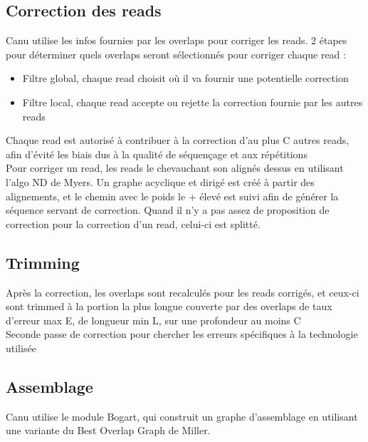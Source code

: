 \documentclass[12pt]{article}
\begin{document}
\subsection{Correction des reads}

Canu utilise les infos fournies par les overlaps pour corriger les reads. 2 étapes pour déterminer quels overlaps seront sélectionnés pour corriger
chaque read : \\

\begin{itemize}
	\item Filtre global, chaque read choisit où il va fournir une potentielle correction
	\item Filtre local, chaque read accepte ou rejette la correction fournie par les autres reads
\end{itemize}

Chaque read est autorisé à contribuer à la correction d'au plus C autres reads, afin d'évité les biais dus à la qualité de séquençage et aux répétitions \\

Pour corriger un read, les reads le chevauchant son alignés dessus en utilisant l'algo ND de Myers. Un graphe acyclique et dirigé est créé à partir
des alignements, et le chemin avec le poids le + élevé est suivi afin de générer la séquence servant de correction. Quand il n'y a pas assez
de proposition de correction pour la correction d'un read, celui-ci est splitté.

\subsection{Trimming}

Après la correction, les overlaps sont recalculés pour les reads corrigés, et ceux-ci sont trimmed à la portion la plus longue couverte par des overlaps
de taux d'erreur max E, de longueur min L, sur une profondeur au moins C \\

Seconde passe de correction pour chercher les erreurs spécifiques à la technologie utilisée

\subsection{Assemblage}

Canu utilise le module Bogart, qui construit un graphe d'assemblage en utilisant une variante du Best Overlap Graph de Miller. \\
\end{document}
